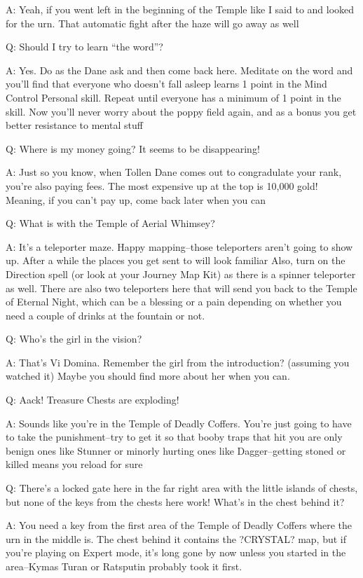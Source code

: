 \documentclass[12pt]{article}
\begin{document}
A: Yeah, if you went left in the beginning of the Temple like I said to
and looked for the urn. That automatic fight after the haze will go away
as well

Q: Should I try to learn ``the word''?

A: Yes. Do as the Dane ask and then come back here. Meditate on the word
and you'll find that everyone who doesn't fall asleep learns 1 point in
the Mind Control Personal skill. Repeat until everyone has a minimum of
1 point in the skill. Now you'll never worry about the poppy field
again, and as a bonus you get better resistance to mental stuff

Q: Where is my money going? It seems to be disappearing!

A: Just so you know, when Tollen Dane comes out to congradulate your
rank, you're also paying fees. The most expensive up at the top is
10,000 gold! Meaning, if you can't pay up, come back later when you can

Q: What is with the Temple of Aerial Whimsey?

A: It's a teleporter maze. Happy mapping--those teleporters aren't going
to show up. After a while the places you get sent to will look familiar
Also, turn on the Direction spell (or look at your Journey Map Kit) as
there is a spinner teleporter as well. There are also two teleporters
here that will send you back to the Temple of Eternal Night, which can
be a blessing or a pain depending on whether you need a couple of drinks
at the fountain or not.

Q: Who's the girl in the vision?

A: That's Vi Domina. Remember the girl from the introduction? (assuming
you watched it) Maybe you should find more about her when you can.

Q: Aack! Treasure Chests are exploding!

A: Sounds like you're in the Temple of Deadly Coffers. You're just going
to have to take the punishment--try to get it so that booby traps that
hit you are only benign ones like Stunner or minorly hurting ones like
Dagger--getting stoned or killed means you reload for sure

Q: There's a locked gate here in the far right area with the little
islands of chests, but none of the keys from the chests here work!
What's in the chest behind it?

A: You need a key from the first area of the Temple of Deadly Coffers
where the urn in the middle is. The chest behind it contains the
?CRYSTAL? map, but if you're playing on Expert mode, it's long gone by
now unless you started in the area--Kymas Turan or Ratsputin probably
took it first.
\end{document}

